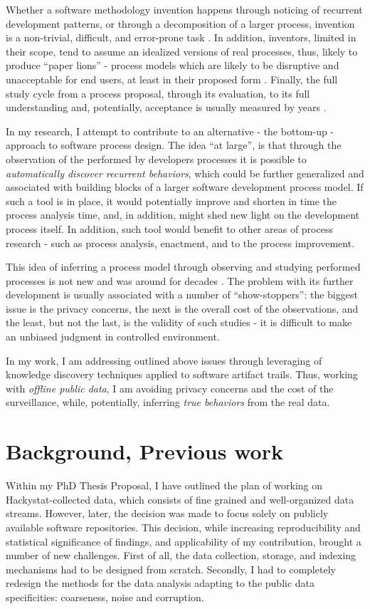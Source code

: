 \documentclass[11pt,oneside]{article}
\numberwithin{equation}{subsection}
\begin{document}
Whether a software methodology invention happens through noticing of recurrent development
patterns, or through a decomposition of a larger process, invention is a non-trivial, difficult,
and error-prone task \cite{citeulike:5043104}. In addition, inventors, limited in their scope, 
tend to assume an idealized versions of real processes, thus, likely to produce ``paper lions''
- process models which are likely to be disruptive and unacceptable for end users, at least 
in their proposed form \cite{citeulike:9758924}. Finally, the full study cycle from a process
proposal, through its evaluation, to its full understanding and, potentially, acceptance is usually
measured by years \cite{citeulike:113403}.

In my research, I attempt to contribute to an alternative - the bottom-up - approach to software
process design. The idea ``at large'', is that through the observation of the performed 
by developers processes it is possible to \textit{automatically discover recurrent behaviors}, which
could be further generalized and associated with building blocks of a larger software development
process model. If such a tool is in place, it would potentially improve and shorten in time the
process analysis time, and, in addition, might shed new light on the development process itself.
In addition, such tool would benefit to other areas of process research - such as process
analysis, enactment, and to the process improvement.

This idea of inferring a process model through observing and studying performed processes is
not new and was around for decades \cite{citeulike:328044}. The problem with its further
development is usually associated with a number of ``show-stoppers'': the biggest issue is the
privacy concerns, the next is the overall cost of the observations, and the least, but not
the last, is the validity of such studies - it is difficult to make an unbiased judgment in
controlled environment. 

In my work, I am addressing outlined above issues through leveraging of knowledge
discovery techniques applied to software artifact trails. Thus, working with \textit{offline
public data}, I am avoiding privacy concerns and the cost of the surveillance, while, potentially, 
inferring \textit{true behaviors} from the real data.

\section{Background, Previous work}
Within my PhD Thesis Proposal, I have outlined the plan of working on Hackystat-collected data,
which consists of fine grained and well-organized data streams. However, later, the decision was
made to focus solely on publicly available software repositories. This decision, while increasing
reproducibility and statistical significance of findings, and applicability of my
contribution, brought a number of new challenges. First of all, the data collection,
storage, and indexing mechanisms had to be designed from scratch. Secondly, I had to
completely redesign the methods for the data analysis adapting to the public data specificities:
coarseness, noise and corruption.
\end{document}
